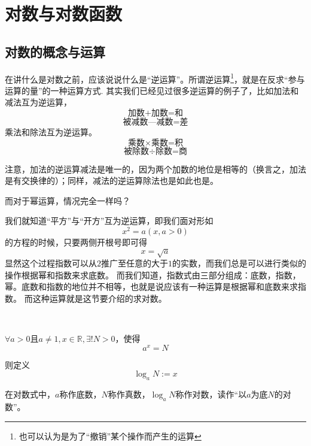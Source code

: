\section{对数与对数函数}
\subsection{对数的概念与运算}
在讲什么是对数之前，应该说说什么是“逆运算”。所谓逆运算\footnote{也可以认为是为了“撤销”某个操作而产生的运算}，就是在反求“参与运算的量”的一种运算方式.
其实我们已经见过很多逆运算的例子了，比如加法和减法互为逆运算，
\[\text{加数+加数=和}\]
\[\text{被减数—减数=差}\]
乘法和除法互为逆运算。
\[\text{乘数}\times \text{乘数=积}\]
\[\text{被除数}\div\text{除数=商} \]

注意，加法的逆运算减法是唯一的，因为两个加数的地位是相等的（换言之，加法是有交换律的）；同样，减法的逆运算除法也是如此也是。

而对于幂运算，情况完全一样吗？

我们就知道“平方”与“开方”互为逆运算，即我们面对形如
\[x^2=a(x,a>0)\]的方程的时候，只要两侧开根号即可得\[x=\sqrt{a}\]
显然这个过程指数可以从$2$推广至任意的大于$1$的实数，而我们总是可以进行类似的操作根据幂和指数来求底数。
而我们知道，指数式由三部分组成：底数，指数，幂。底数和指数的地位并不相等，也就是说应该有一种运算是根据幂和底数来求指数。
而这种运算就是这节要介绍的求对数。
\begin{definition}[对数]
    \ 

    $\forall a>0\text{且}a\ne1,x\in \mathbb{R},\exists!N>0$，使得
    \[a^x=N\]

    则定义
    \[\log_aN:=x\]

    在对数式中，$a$称作底数，$N$称作真数，$\log_aN$称作对数，读作“以$a$为底$N$的对数”。
\end{definition}

